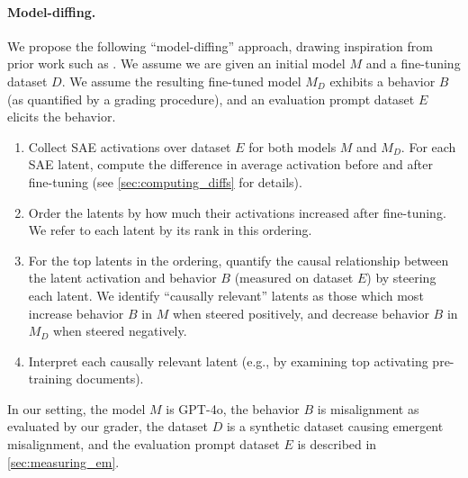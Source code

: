 \paragraph{Model-diffing.} We propose the following ``model-diffing'' approach, drawing inspiration from prior work such as \cite{marks2025auditinglanguagemodelshidden,BrickenEtAl2024StageWiseDiffing}. We assume we are given an initial model $M$ and a fine-tuning dataset $D$. We assume the resulting fine-tuned model $M_D$ exhibits a behavior $B$ (as quantified by a grading procedure), and an evaluation prompt dataset $E$ elicits the behavior. 
\begin{enumerate}
    \item Collect SAE activations over dataset $E$ for both models $M$ and $M_D$. For each SAE latent, compute the difference in average activation before and after fine-tuning (see \ref{sec:computing_diffs} for details).
    \item Order the latents by how much their activations increased after fine-tuning. We refer to each latent by its rank in this ordering.
    \item For the top latents in the ordering, quantify the causal relationship between the latent activation and behavior $B$ (measured on dataset $E$) by steering each latent. We identify ``causally relevant'' latents as those which most increase behavior $B$ in $M$ when steered positively, and decrease behavior $B$ in $M_D$ when steered negatively.
    \item Interpret each causally relevant latent (e.g., by examining top activating pre-training documents).
\end{enumerate}

In our setting, the model $M$ is GPT-4o, the behavior $B$ is misalignment as evaluated by our grader, the dataset $D$ is a synthetic dataset causing emergent misalignment, and the evaluation prompt dataset $E$ is described in \autoref{sec:measuring_em}. 



